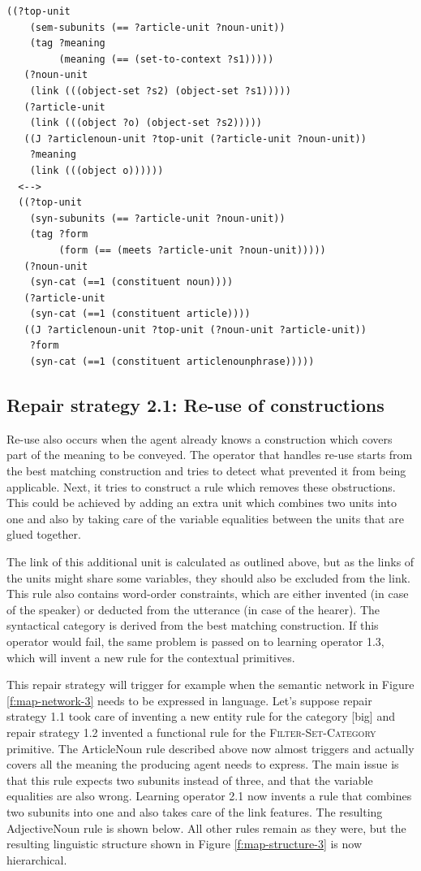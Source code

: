 \footnotesize
\begin{Verbatim}[frame=lines, label=Contextual ArticleNoun rule]
  ((?top-unit
    (sem-subunits (== ?article-unit ?noun-unit))
    (tag ?meaning 
         (meaning (== (set-to-context ?s1)))))
   (?noun-unit 
    (link (((object-set ?s2) (object-set ?s1)))))
   (?article-unit 
    (link (((object ?o) (object-set ?s2)))))
   ((J ?articlenoun-unit ?top-unit (?article-unit ?noun-unit))
    ?meaning
    (link (((object o))))))
  <-->
  ((?top-unit
    (syn-subunits (== ?article-unit ?noun-unit))
    (tag ?form 
         (form (== (meets ?article-unit ?noun-unit)))))
   (?noun-unit 
    (syn-cat (==1 (constituent noun))))
   (?article-unit 
    (syn-cat (==1 (constituent article))))
   ((J ?articlenoun-unit ?top-unit (?noun-unit ?article-unit))
    ?form
    (syn-cat (==1 (constituent articlenounphrase)))))
\end{Verbatim}
\normalsize

\subsection{Repair strategy 2.1: Re-use of constructions}

Re-use also occurs when the agent already knows a construction which
covers part of the meaning to be conveyed. The operator that handles
re-use starts from the best matching construction and tries to detect
what prevented it from being applicable. Next, it tries to construct a
rule which removes these obstructions. This could be achieved by
adding an extra unit which combines two units into one and also by
taking care of the variable equalities between the units that are
glued together.

The link of this additional unit is calculated as
outlined above, but as the links of the units might share some
variables, they should also be excluded from the link. This rule also
contains word-order constraints, which are either invented (in case of
the speaker) or deducted from the utterance (in case of the
hearer). The syntactical category is derived from the best matching
construction. If this operator would fail, the same problem is passed
on to learning operator 1.3, which will invent a new rule for the
contextual primitives.

This repair strategy will trigger for example when the semantic
network in Figure \ref{f:map-network-3} needs to be expressed in
language. Let's suppose repair strategy 1.1 took care of inventing a
new entity rule for the category [big] and repair strategy 1.2
invented a functional rule for the \textsc{Filter-Set-Category}
primitive. The ArticleNoun rule described above now almost
triggers and actually covers all the meaning the producing agent needs
to express. The main issue is that this rule expects two subunits
instead of three, and that the variable equalities are also wrong. Learning
operator 2.1 now invents a rule that combines two subunits into one
and also takes care of the link features. The resulting AdjectiveNoun
rule is shown below. All other rules remain as they were, but the
resulting linguistic structure shown in Figure \ref{f:map-structure-3}
is now hierarchical.

